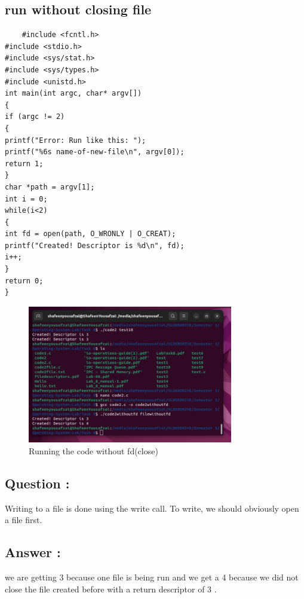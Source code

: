 \documentclass[12pt]{article}
\begin{document}
\subsection{run without closing file}
\begin{verbatim}
    #include <fcntl.h>
#include <stdio.h>
#include <sys/stat.h>
#include <sys/types.h>
#include <unistd.h>
int main(int argc, char* argv[])
{
if (argc != 2)
{
printf("Error: Run like this: ");
printf("%6s name-of-new-file\n", argv[0]);
return 1;
}
char *path = argv[1];
int i = 0;
while(i<2)
{
int fd = open(path, O_WRONLY | O_CREAT);
printf("Created! Descriptor is %d\n", fd);
i++;
}
return 0;
}
\end{verbatim}
        \begin{figure}
            \centering
            \includegraphics[width=0.8\textwidth]{image.png}
            \caption{Running the code without fd(close)}
            \label{fig:enter-label}
        \end{figure}
\subsection{Question : }
Writing to a file is done using the write call.
To write, we should obviously open a file first.
\subsection{Answer :}
we are getting 3 because one file is being run and we get a 4 because we did not close the file 
created before with a return descriptor of 3 .
\end{document}
